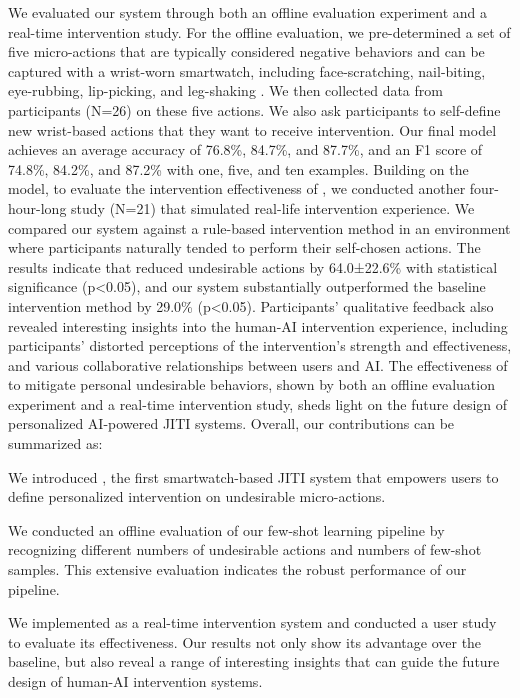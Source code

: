We evaluated our system through both an offline evaluation experiment and a real-time intervention study.
For the offline evaluation, we pre-determined a set of five micro-actions that are typically considered negative behaviors and can be captured with a wrist-worn smartwatch, including face-scratching, nail-biting, eye-rubbing, lip-picking, and leg-shaking \cite{stein1998phenomenology, snorrason2012skin,teng2002body,oshio2018shake,stein2008trichotillomania}.
We then collected data from participants (N=26) on these five actions. We also ask participants to self-define new wrist-based actions that they want to receive intervention. Our final model achieves an average accuracy of 76.8\%, 84.7\%, and 87.7\%, and an F1 score of 74.8\%, 84.2\%, and 87.2\% with one, five, and ten examples.
Building on the model, to evaluate the intervention effectiveness of \projectname, we conducted another four-hour-long study (N=21) that simulated real-life intervention experience.
We compared our system against a rule-based intervention method in an environment where participants naturally tended to perform their self-chosen actions.
The results indicate that \projectname reduced undesirable actions by 64.0±22.6\% with statistical significance (p<0.05), and our system substantially outperformed the baseline intervention method by 29.0\% (p<0.05).
Participants' qualitative feedback also revealed interesting insights into the human-AI intervention experience, including participants' distorted perceptions of the intervention's strength and effectiveness, and various collaborative relationships between users and AI.
The effectiveness of \projectname to mitigate personal undesirable behaviors, shown by both an offline evaluation experiment and a real-time intervention study, sheds light on the future design of personalized AI-powered JITI systems.
Overall, our contributions can be summarized as:

\begin{s_itemize}
\item We introduced \projectname, the first smartwatch-based JITI system that empowers users to define personalized intervention on undesirable micro-actions.
\item We conducted an offline evaluation of our few-shot learning pipeline by recognizing different numbers of undesirable actions and numbers of few-shot samples. This extensive evaluation indicates the robust performance of our pipeline.
\item We implemented \projectname as a real-time intervention system and conducted a user study to evaluate its effectiveness. Our results not only show its advantage over the baseline, but also reveal a range of interesting insights that can guide the future design of human-AI intervention systems.
\end{s_itemize}